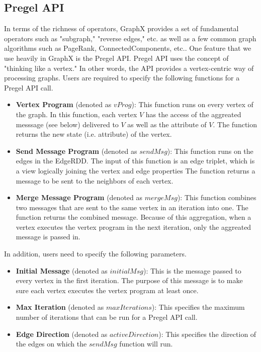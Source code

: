 \subsection{Pregel API}
%
In terms of the richness of operators, GraphX provides a set of fundamental operators such as "subgraph," "reverse edges," etc. as well as a few common graph algorithms such as PageRank, ConnectedComponents, etc..
%
One feature that we use heavily in GraphX is the Pregel API.
%
Pregel API uses the concept of "thinking like a vertex."
%
In other words, the API provides a vertex-centric way of processing graphs.
%
Users are required to specify the following functions for a Pregel API call.
%
\begin{itemize}

\item \textbf{Vertex Program} (denoted as $vProg$): 
%
This function runs on every vertex of the graph.
%
In this function, each vertex $V$ has the access of the aggreated messsage (see below) delivered to $V$ as well as the attribute of $V$.
%
The function returns the new state (i.e. attribute) of the vertex.
%
\item \textbf{Send Message Program} (denoted as $sendMsg$):
%
This function runs on the edges in the EdgeRDD. 
%
The input of this function is an edge triplet, which is a view logically joining the vertex and edge properties
%
The function returns a message to be sent to the neighbors of each vertex.
%
\item \textbf{Merge Message Program} (denoted as $mergeMsg$):
%
This function combines two messages that are sent to the same vertex in an iteration into one.
%
The function returns the combined message.
%
Because of this aggregation, when a vertex executes the vertex program in the next iteration, only the aggreated message is passed in.
%
\end{itemize}
%
In addition, users need to specify the following parameters.
%
\begin{itemize}
%
\item \textbf{Initial Message} (denoted as $initialMsg$):
%
This is the message passed to every vertex in the first iteration.
%
The purpose of this message is to make sure each vertex executes the vertex program at least once.
%
\item \textbf{Max Iteration} (denoted as $maxIterations$):
%
This specifies the maximum number of iterations that can be run for a Pregel API call.
%
\item \textbf{Edge Direction} (denoted as $activeDirection$):
%
This specifies the direction of the edges on which the $sendMsg$ function will run.
%
\end{itemize}
